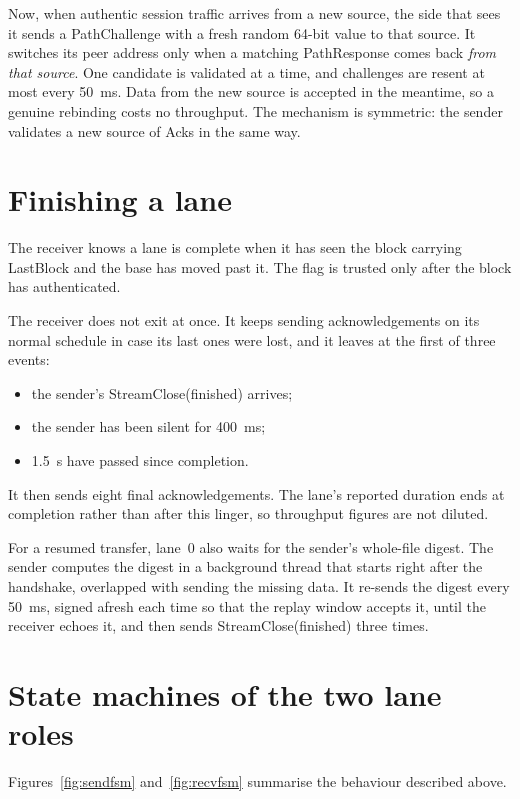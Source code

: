 Now, when authentic session traffic arrives from a new source, the side that sees it sends a PathChallenge with
a fresh random 64-bit value to that source. It switches its peer address only when a matching PathResponse comes
back \emph{from that source}. One candidate is validated at a time, and challenges are resent at most every
50~ms. Data from the new source is accepted in the meantime, so a genuine rebinding costs no throughput. The
mechanism is symmetric: the sender validates a new source of Acks in the same way.

\section{Finishing a lane}

The receiver knows a lane is complete when it has seen the block carrying LastBlock and the base has moved past
it. The flag is trusted only after the block has authenticated.

The receiver does not exit at once. It keeps sending acknowledgements on its normal schedule in case its last
ones were lost, and it leaves at the first of three events:
\begin{itemize}
  \item the sender's StreamClose(finished) arrives;
  \item the sender has been silent for 400~ms;
  \item 1.5~s have passed since completion.
\end{itemize}
It then sends eight final acknowledgements. The lane's reported duration ends at completion rather than after
this linger, so throughput figures are not diluted.

For a resumed transfer, lane~0 also waits for the sender's whole-file digest. The sender computes the digest in a
background thread that starts right after the handshake, overlapped with sending the missing data. It re-sends
the digest every 50~ms, signed afresh each time so that the replay window accepts it, until the receiver
echoes it, and then sends StreamClose(finished) three times.

\section{State machines of the two lane roles}

Figures~\ref{fig:sendfsm} and~\ref{fig:recvfsm} summarise the behaviour described above.

